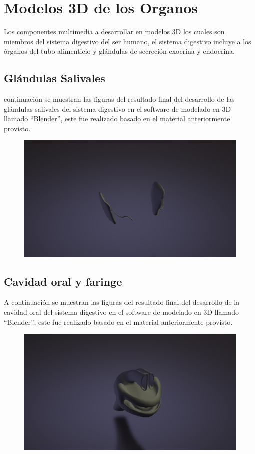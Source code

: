 \section{Modelos 3D de los Organos}
Los componentes multimedia a desarrollar en modelos 3D los cuales son miembros del sistema digestivo del ser humano, 
el sistema digestivo incluye a los órganos del tubo alimenticio y glándulas de secreción exocrina y endocrina.\\

\subsection{Glándulas Salivales}
 continuación se muestran las figuras del resultado final del desarrollo de las glándulas salivales del sistema digestivo 
 en el software de modelado en 3D llamado “Blender”, este fue realizado basado en el material anteriormente provisto.\\
\begin{figure}[H]
	\begin{center}
 		\includegraphics[width = .5\textwidth]{source/images/image41.png}
	\end{center} 
\end{figure}

\subsection{Cavidad oral y faringe}
A continuación se muestran las figuras del resultado final del desarrollo de la cavidad oral del sistema digestivo en el software de modelado en 3D llamado “Blender”, este fue realizado basado en el material anteriormente provisto.\\
\begin{figure}[H]
	\begin{center}
 		\includegraphics[width = .5\textwidth]{source/images/image14.png}
	\end{center} 
\end{figure}

